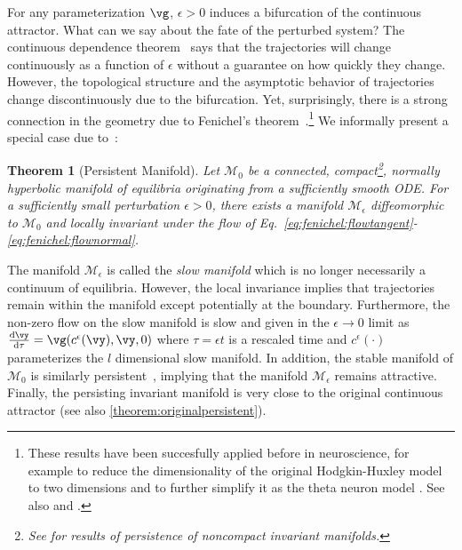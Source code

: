 \documentclass{article} %
\newcommand{\pscomment}[1]{\textcolor{BurntOrange}{(#1)}}
\newcounter{ct}
\newcommand{\dm}[1]{\ensuremath{\mathrm{d}{#1}}} %
\newcommand{\RN}[2]{\frac{\dm{#1}}{\dm{#2}}} %
\newcommand{\manifold}{\mathcal{M}}
\newtheorem{theorem}{Theorem}
\theoremstyle{definition}
\theoremstyle{remark}
\renewcommand{\cite}{\citep}
\begin{document}
For any parameterization $\vg$, $\epsilon > 0$ induces a bifurcation of the continuous attractor.
What can we say about the fate of the perturbed system?
The continuous dependence theorem~\citep{Chicone2006} says that the trajectories will change continuously as a function of \(\epsilon\) without a guarantee on how quickly they change.
However, the topological structure and the asymptotic behavior of trajectories change discontinuously due to the bifurcation.
Yet, surprisingly, there is a strong connection in the geometry due to Fenichel's theorem~\cite{fenichel1971}.\footnote{These results have been succesfully applied before in neuroscience, for example to reduce the dimensionality of the original Hodgkin-Huxley model \citep{hodgkin1952quantitative} to two dimensions \citep{rinzel1985excitation} and to further simplify it as the theta neuron model \citep{ermentrout1986parabolic}. See also \citep{Kopell1996} and \citep{ermentrout2010}.}
We informally present a special case due to~\citet{Jones1995}:

\setlength\belowcaptionskip{2ex}

\begin{theorem}[Persistent Manifold]\label{theorem:persistent}
Let \(\manifold_0\) be a connected, compact\footnote{See \citep{eldering2013normally} for results of persistence of noncompact invariant manifolds.}, normally hyperbolic manifold of equilibria originating from a sufficiently smooth ODE.
For a sufficiently small perturbation \(\epsilon > 0\), there exists a manifold \(\manifold_\epsilon\) diffeomorphic to \(\manifold_0\) and locally invariant under the flow of Eq.~\eqref{eq:fenichel:flowtangent}-\eqref{eq:fenichel:flownormal}.
\end{theorem}

The manifold \(\manifold_\epsilon\) is called the \emph{slow manifold} which is no longer necessarily a continuum of equilibria.
However, the local invariance implies that trajectories remain within the manifold except potentially at the boundary.
Furthermore, the non-zero flow on the slow manifold is slow and given in the \(\epsilon \to 0\) limit as \(\RN{\vy}{\tau} = \vg(c^\epsilon(\vy), \vy, 0)\) where \(\tau = \epsilon t\) is a rescaled time and \(c^\epsilon(\cdot)\) parameterizes the \(l\) dimensional slow manifold.
In addition, the stable manifold of \(\manifold_0\) is similarly persistent~\cite{Jones1995}, implying that the manifold \(\manifold_\epsilon\) remains attractive.
Finally, the persisting invariant manifold is very close to the original continuous attractor (see also \ref{theorem:originalpersistent}).
\end{document}
